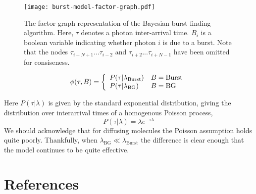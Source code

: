 \documentclass{article}
\newcommand{\lburst}{\ensuremath{\lambda_\mathrm{Burst}}}
\newcommand{\lbg}{\ensuremath{\lambda_\mathrm{BG}}}
\begin{document}
\begin{figure}
\centering
\texttt{[image: burst-model-factor-graph.pdf]}
\caption{The factor graph representation of the Bayesian burst-finding
algorithm. Here, $\tau$ denotes a photon inter-arrival time. $B_i$ is
a boolean variable indicating whether photon $i$ is due to a
burst. Note that the nodes $\tau_{i-N+1} ... \tau_{i-2}$ and
$\tau_{i+2} ... \tau_{i+N-1}$ have been omitted for consiseness.}
\end{figure}

\begin{equation}
  \phi(\tau, B) = \left\{
    \begin{array}{l l}
      P(\tau \vert \lambda_\mathrm{Burst})  & B = \mathrm{Burst} \\
      P(\tau \vert \lambda_\mathrm{BG})     & B = \mathrm{BG} \\
    \end{array}
  \right.
\end{equation}

Here $P(\tau \vert \lambda)$ is given by the standard exponential
distribution, giving the distribution over interarrival times of a
homogenous Poisson process,
\[ P(\tau \vert \lambda) = \lambda e^{-\tau \lambda} \]
We should acknowledge that for diffusing molecules the Poisson assumption
holds quite poorly. Thankfully, when $\lbg \ll \lburst$ the difference
is clear enough that the model continues to be quite effective.

\appendix
\section{References}


\end{document}
